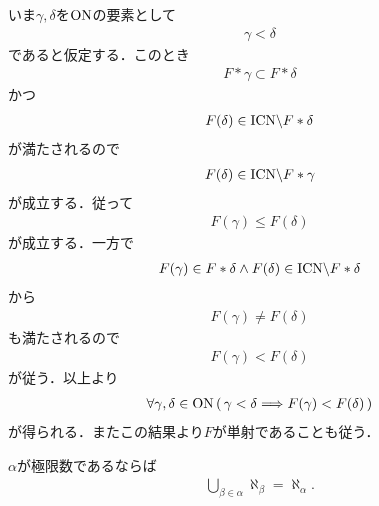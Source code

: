 	\begin{sketch}
		いま$\gamma,\delta$を$\mathrm{ON}$の要素として
		\begin{align}
			\gamma < \delta
		\end{align}
		であると仮定する．このとき
		\begin{align}
			F \ast \gamma \subset F \ast \delta
		\end{align}
		かつ
		\begin{align}
			F(\delta) \in \mathrm{ICN} \backslash F \ast \delta
		\end{align}
		が満たされるので
		\begin{align}
			F(\delta) \in \mathrm{ICN} \backslash F \ast \gamma
		\end{align}
		が成立する．従って
		\begin{align}
			F(\gamma) \leq F(\delta)
		\end{align}
		が成立する．一方で
		\begin{align}
			F(\gamma) \in F \ast \delta \wedge
			F(\delta) \in \mathrm{ICN} \backslash F \ast \delta
		\end{align}
		から
		\begin{align}
			F(\gamma) \neq F(\delta)
		\end{align}
		も満たされるので
		\begin{align}
			F(\gamma) < F(\delta)
		\end{align}
		が従う．以上より
		\begin{align}
			\forall \gamma, \delta \in \mathrm{ON}\, (\, \gamma < \delta \Longrightarrow F(\gamma) < F(\delta)\, )
		\end{align}
		が得られる．またこの結果より$F$が単射であることも従う．
	\end{sketch}
	
	\begin{screen}
		\begin{thm}
			$\alpha$が極限数であるならば
			\begin{align}
				\bigcup_{\beta \in \alpha} \aleph_{\beta} = \aleph_{\alpha}.
			\end{align}
		\end{thm}
	\end{screen}
	
